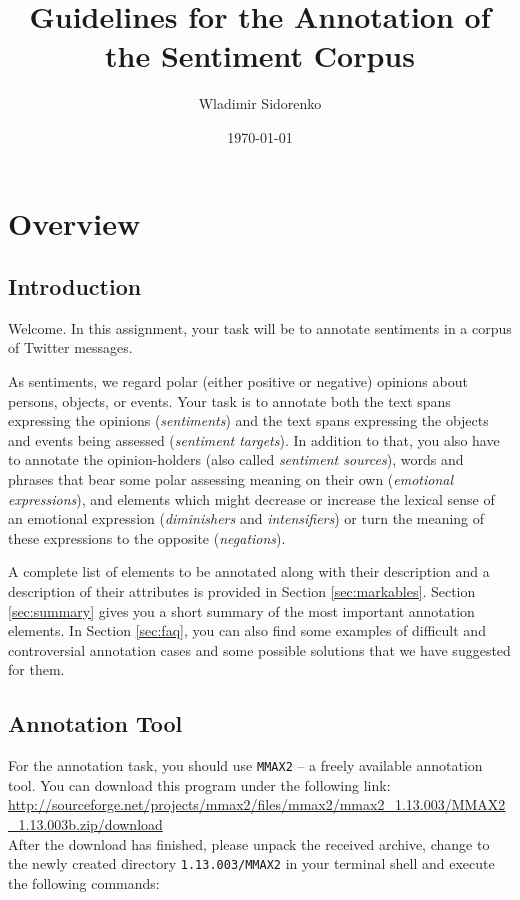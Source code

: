 \documentclass[11pt,a4paper]{article}
\author{Wladimir Sidorenko}
\date{\today}
\title{Guidelines for the Annotation of the Sentiment Corpus}
\begin{document}
\maketitle{}
\section{Overview}
\subsection{Introduction}

Welcome.  In this assignment, your task will be to annotate sentiments
in a corpus of Twitter messages.

As sentiments, we regard polar (either positive or negative) opinions
about persons, objects, or events.  Your task is to annotate both the
text spans expressing the opinions (\textit{sentiments}) and the text
spans expressing the objects and events being assessed
(\textit{sentiment targets}). In addition to that, you also have to
annotate the opinion-holders (also called \textit{sentiment sources}),
words and phrases that bear some polar assessing meaning on their own
(\textit{emotional expressions}), and elements which might decrease or
increase the lexical sense of an emotional expression
(\textit{diminishers} and \textit{intensifiers}) or turn the meaning
of these expressions to the opposite (\textit{negations}).

A complete list of elements to be annotated along with their
description and a description of their attributes is provided in
Section \ref{sec:markables}.  Section \ref{sec:summary} gives you a
short summary of the most important annotation elements. In Section
\ref{sec:faq}, you can also find some examples of difficult and
controversial annotation cases and some possible solutions that we
have suggested for them.

\subsection{Annotation Tool}

For the annotation task, you should use \texttt{MMAX2} -- a freely
available annotation tool.  You can download this program under the
following link:\\\newline
{\setlength{\parindent}{0pt}\small\url{http://sourceforge.net/projects/mmax2/files/mmax2/mmax2_1.13.003/MMAX2_1.13.003b.zip/download}}\\\newline
After the download has finished, please unpack the received archive,
change to the newly created directory \texttt{1.13.003/MMAX2} in your
terminal shell and execute the following commands:\\
\end{document}

